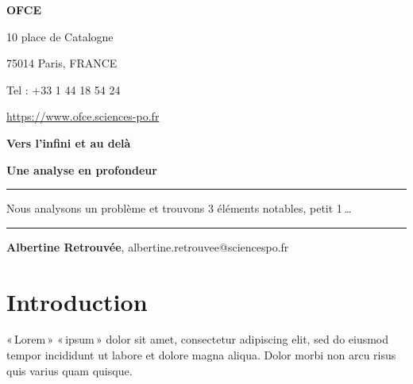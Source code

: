 \documentclass[
  9pt,
  a4paper,
  DIV=11]{scrreprt}
\renewcommand*\contentsname{Table des matières}
\newcommand\contentsname{Table des matières}
\begin{document}
\begin{titlepage}
{\begin{minipage}[b]{40em}
{          \vspace{0.2cm}
          \vspace{0.2cm}
        
        \textbf{OFCE} 
  
        10 place de Catalogne 
        
        75014 Paris, FRANCE 
        
        Tel : +33 1 44 18 54 24
        
        \url{https://www.ofce.sciences-po.fr}
      }
    \end{minipage}
}
\newpage
\pagestyle{empty}
 
\LARGE\textbf{Vers l'infini et au delà}

\large\textbf{Une analyse en profondeur}

\vspace{1cm}


\par\rule{\textwidth}{0.5pt}

Nous analysons un problème et trouvons 3 éléments notables, petit
1\,\ldots{}

\par\rule{\textwidth}{0.5pt}


\vspace{1cm}

\begin{flushright}
   \linespread{1}\small{\textbf{Albertine
Retrouvée}}, {\small{albertine.retrouvee@sciencespo.fr}}\par
\end{flushright}
\end{titlepage}
\renewcommand*\contentsname{Table des matières}
{
\hypersetup{linkcolor=}
\setcounter{tocdepth}{0}
\tableofcontents
}
\chapter*{Introduction}\label{sec-introduction}

«\,Lorem\,» «\,ipsum\,» dolor sit amet, consectetur adipiscing elit, sed
do eiusmod tempor incididunt ut labore et dolore magna aliqua. Dolor
morbi non arcu risus quis varius quam quisque.
\end{document}

